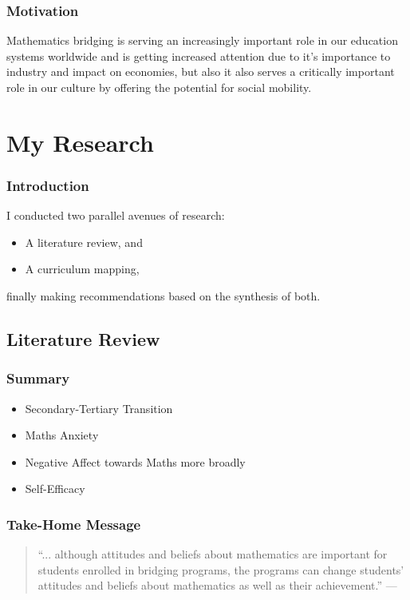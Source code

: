 \documentclass[14pt]{beamer}
\begin{document}
\begin{frame}
\frametitle{Motivation}
Mathematics bridging is serving an increasingly important role in our education systems worldwide and is getting increased attention due to it's importance to industry and impact on economies, but also it also serves a critically important role in our culture by offering the potential for social mobility.
\end{frame}

\section{My Research}

\begin{frame}
\frametitle{Introduction}
I conducted two parallel avenues of research:
\begin{itemize}
	\item A literature review, and
	\item A curriculum mapping,
\end{itemize}
finally making recommendations based on the synthesis of both.
\end{frame}

\subsection{Literature Review}

\begin{frame}
\frametitle{Summary}
\begin{itemize}
	\item Secondary-Tertiary Transition \cite{Clark2008}
	\item Maths Anxiety \cite{Ramirez2018}
	\item Negative Affect towards Maths more broadly \cite{King2015}
	\item Self-Efficacy \cite{Klinger2011}
\end{itemize}
\end{frame}

\begin{frame}
\frametitle{Take-Home Message}
\begin{quote}
``... although attitudes and beliefs about mathematics are important for students
enrolled in bridging programs, the programs can change students' attitudes and
beliefs about mathematics as well as their achievement.'' \flushright ---
\end{quote}
\end{frame}
\end{document}
